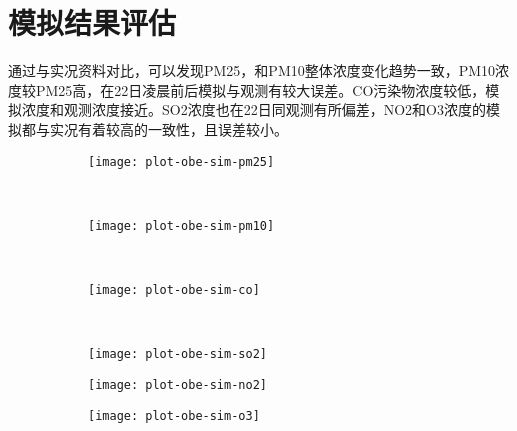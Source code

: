 \section{模拟结果评估}

通过与实况资料对比，可以发现PM25，和PM10整体浓度变化趋势一致，PM10浓度较PM25高，在22日凌晨前后模拟与观测有较大误差。CO污染物浓度较低，模拟浓度和观测浓度接近。SO2浓度也在22日同观测有所偏差，NO2和O3浓度的模拟都与实况有着较高的一致性，且误差较小。

\begin{figure}[!htbp]
    \centering
    \begin{subfigure}[b]{0.35\textwidth}
      \texttt{[image: plot-obe-sim-pm25]}
      \caption{}
      \label{fig:plot-obe-sim-pm25}
    \end{subfigure}%
    ~%
    \begin{subfigure}[b]{0.35\textwidth}
      \texttt{[image: plot-obe-sim-pm10]}
      \caption{}
      \label{fig:plot-obe-sim-pm10}
    \end{subfigure}
    \\%
    \begin{subfigure}[b]{0.35\textwidth}
      \texttt{[image: plot-obe-sim-co]}
      \caption{}
      \label{fig:plot-obe-sim-co}
    \end{subfigure}%
    ~%
    \begin{subfigure}[b]{0.35\textwidth}
      \texttt{[image: plot-obe-sim-so2]}
      \caption{}
      \label{fig:plot-obe-sim-so2}
    \end{subfigure}
    \begin{subfigure}[b]{0.35\textwidth}
      \texttt{[image: plot-obe-sim-no2]}
      \caption{}
      \label{fig:plot-obe-sim-no2}
    \end{subfigure}
    \begin{subfigure}[b]{0.35\textwidth}
      \texttt{[image: plot-obe-sim-o3]}
      \caption{}
      \label{fig:plot-obe-sim-o3}
    \end{subfigure}
    \label{fig:oaspl}
\end{figure}

